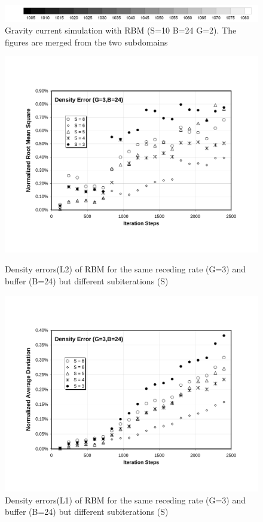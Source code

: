 \begin{figure}[htbp]
\begin{center}
    \includegraphics[scale=0.35]{../figures/Exp3-CASE1-dt0.005/legend.pdf}
    \caption{Gravity current simulation with RBM (S=10 B=24 G=2). The figures are merged from the two subdomains}
    \label{fig:RBM-GC-2Domain-S10-B24-G2-660}
  \end{center}
\end{figure}


\cp

\begin{figure}[htbp]
  \begin{center}
\includegraphics[scale=0.6]{../figures/Exp3-CASE1-dt0.005/G_3_B_24/G3-B24-Den-NRMS.pdf}
    \caption{Density errors(L2) of RBM for the same receding rate (G=3) and buffer (B=24) but different subiterations (S)}
        \vspace{0.5in}
\includegraphics[scale=0.6]{../figures/Exp3-CASE1-dt0.005/G_3_B_24/G3-B24-Den-NAD.pdf}
    \caption{Density errors(L1) of RBM for the same receding rate (G=3) and buffer (B=24) but different subiterations (S)}
  \end{center}
\end{figure}

